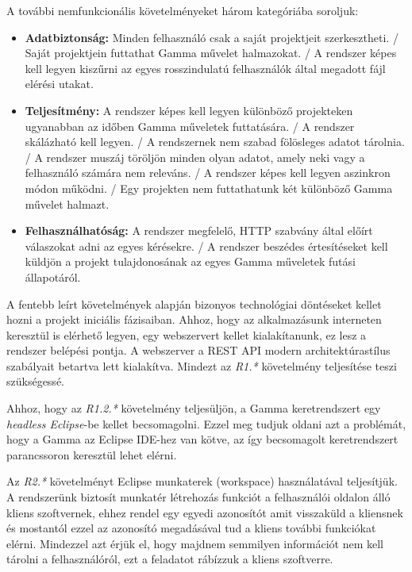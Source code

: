 \noindent A további nemfunkcionális követelményeket három kategóriába soroljuk:
\begin{itemize}
	\item \textbf{Adatbiztonság:} Minden felhasználó csak a saját projektjeit szerkesztheti. / Saját projektjein futtathat Gamma művelet halmazokat. / A rendszer képes kell legyen kiszűrni az egyes rosszindulatú felhasználók által megadott fájl elérési utakat. 
	\item \textbf{Teljesítmény:} A rendszer képes kell legyen különböző projekteken ugyanabban az időben Gamma műveletek futtatására. / A rendszer skálázható kell legyen. / A rendszernek nem szabad fölösleges adatot tárolnia. / A rendszer muszáj töröljön minden olyan adatot, amely neki vagy a felhasználó számára nem releváns. / A rendszer képes kell legyen aszinkron módon működni. / Egy projekten nem futtathatunk két különböző Gamma művelet halmazt.
	\item \textbf{Felhasználhatóság:} A rendszer megfelelő, HTTP szabvány által előírt válaszokat adni az egyes kérésekre. / A rendszer beszédes értesítéseket kell küldjön a projekt tulajdonosának az egyes Gamma műveletek futási állapotáról.
\end{itemize}

A fentebb leírt követelmények alapján bizonyos technológiai döntéseket kellet hozni a projekt iniciális fázisaiban. Ahhoz, hogy az alkalmazásunk interneten keresztül is elérhető legyen, egy webszervert kellet kialakítanunk, ez lesz a rendszer belépési pontja. A webszerver a REST API modern architektúrastílus szabályait betartva lett kialakítva. Mindezt az \textit{R1.*} követelmény teljesítése teszi szükségessé. 

Ahhoz, hogy az \textit{R1.2.*} követelmény teljesüljön, a Gamma keretrendszert egy \textit{headless Eclipse}-be kellet becsomagolni. Ezzel meg tudjuk oldani azt a problémát, hogy a Gamma az Eclipse IDE-hez van kötve, az így becsomagolt keretrendszert parancssoron keresztül lehet elérni.

Az \textit{R2.*} követelményt Eclipse munkaterek (workspace) használatával teljesítjük. A rendszerünk biztosít munkatér létrehozás funkciót a felhasználói oldalon álló kliens szoftvernek, ehhez rendel egy egyedi azonosítót amit visszaküld a kliensnek és mostantól ezzel az azonosító megadásával tud a kliens további funkciókat elérni. Mindezzel azt érjük el, hogy majdnem semmilyen információt nem kell tárolni a felhasználóról, ezt a feladatot rábízzuk a kliens szoftverre.

